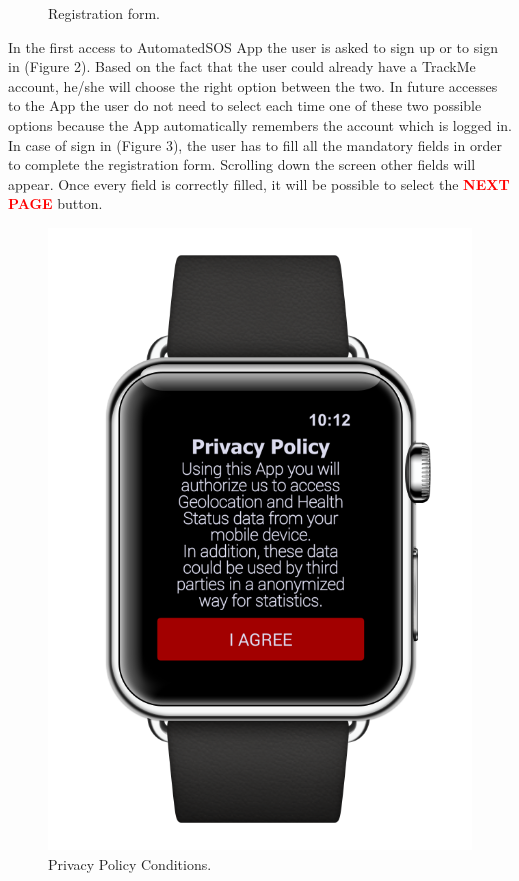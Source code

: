 \begin{enumerate}
\begin{figure}[H]
\begin{center}
\begin{minipage}[c]{.40\textwidth}
          	\caption{Registration form.}
        \end{minipage}
      \end{center}
\end{figure}
In the first access to AutomatedSOS App the user is asked to sign up or to sign in 			(Figure 2). Based on the fact that the user could already have a TrackMe account, he/she will choose the right option between the two. In future accesses to the App the user do not need to select each time one of these two possible options because the App automatically remembers the account which is logged in. In case of sign in (Figure 3), the user has to fill all the mandatory fields in order to complete the registration form. Scrolling down the screen other fields will appear. Once every field is correctly filled, it will be possible to select the {\textcolor{Red}{\textbf{NEXT PAGE}}} button. 
\clearpage
\begin{figure}[H]
\begin{center}
        \begin{minipage}[c]{.40\textwidth}
        \centering
          \includegraphics[height=12 cm]{Images/Mockups/AutomatedSOSMockup2.png}
             	\caption{Privacy Policy Conditions.}
        \end{minipage}%
        \hspace{10mm}%
        \begin{minipage}[c]{.40\textwidth}
        \centering

\end{minipage}
\end{center}
\end{figure}
\end{enumerate}
